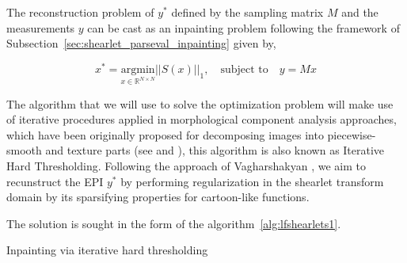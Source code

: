 \bigskip 

The reconstruction problem of $y^*$ defined by the sampling matrix $M$ and the measurements $y$ can be cast as an inpainting problem following the framework of Subsection~\ref{sec:shearlet_parseval_inpainting} given by,

\begin{equation}
\label{eq:lfshearlets8}
x^*=\underset{x\in\mathbb{R}^{N\times N}}{\textrm{argmin}}||S(x)||_1,\quad \textrm{subject to}\quad y=Mx
\end{equation}

\bigskip

The algorithm that we will use to solve the optimization problem will make use of iterative procedures applied in morphological component analysis approaches, which have been originally proposed for decomposing images into piecewise-smooth and texture parts (see \cite{morph} and \cite{mcalab}), this algorithm is also known as Iterative Hard Thresholding. Following the approach of Vagharshakyan \cite{LF-Shearlets}, we aim to recunstruct the EPI $y^*$ by performing regularization in the shearlet transform domain by its sparsifying properties for cartoon-like functions. 

\bigskip

The solution is sought in the form of the algorithm~\ref{alg:lfshearlets1}. 

\begin{algorithm}[h!]

    \caption{Inpainting via iterative hard thresholding}
		\label{alg:lfshearlets1}
\end{algorithm}

